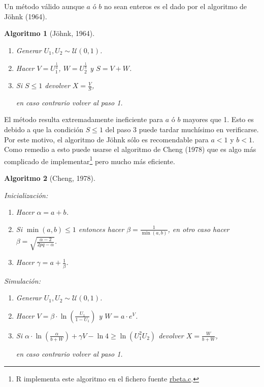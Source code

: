 \documentclass[
]{book}
\theoremstyle{break}
\newtheorem{conjecture}{Algoritmo}[chapter]
\theoremstyle{nonumberplain}
\begin{document}
Un método válido aunque \(a\) ó \(b\) no sean enteros es el dado por el
algoritmo de Jöhnk (1964).

\begin{conjecture}[Jöhnk, 1964]
\protect\hypertarget{cnj:johnk}{}\label{cnj:johnk}

\begin{enumerate}
\def\labelenumi{\arabic{enumi}.}
\item
  Generar \(U_1, U_2\sim \mathcal{U}(0, 1)\).
\item
  Hacer \(V = U_1^{\frac1a}\), \(W = U_2^{\frac1b}\) y \(S = V+W\).
\item
  Si \(S \leq 1\) devolver \(X = \frac VS\),

  en caso contrario volver al paso 1.
\end{enumerate}

\end{conjecture}

El método resulta extremadamente ineficiente para \(a\) ó \(b\) mayores que 1.
Esto es debido a que la condición \(S\leq1\) del paso 3 puede tardar muchísimo en verificarse.
Por este motivo, el algoritmo de Jöhnk sólo es recomendable para \(a<1\) y \(b<1\).
Como remedio a esto puede usarse el algoritmo de Cheng (1978) que es algo más complicado de implementar\footnote{R implementa este algoritmo en el fichero fuente \href{https://svn.r-project.org/R/trunk/src/nmath/rbeta.c}{rbeta.c}.} pero mucho más eficiente.

\begin{conjecture}[Cheng, 1978]
\protect\hypertarget{cnj:cheng}{}\label{cnj:cheng}

Inicialización:

\begin{enumerate}
\def\labelenumi{\arabic{enumi}.}
\item
  Hacer \(\alpha = a + b\).
\item
  Si \(\min(a,b) \leq1\) entonces hacer \(\beta=\frac1{\min( a,b)}\), en otro caso hacer \(\beta=\sqrt{\frac{\alpha-2}{2pq-\alpha}}\).
\item
  Hacer \(\gamma=a+\frac1\beta\).
\end{enumerate}

Simulación:

\begin{enumerate}
\def\labelenumi{\arabic{enumi}.}
\item
  Generar \(U_1, U_2\sim \mathcal{U}(0, 1)\).
\item
  Hacer \(V=\beta\cdot\ln\left( \frac{U_1}{1-U_1}\right)\) y \(W=a\cdot e^{V}\).
\item
  Si \(\alpha\cdot\ln\left( \frac\alpha{b+W}\right) +\gamma V-\ln4 \ge \ln\left( U_1^{2}U_2\right)\) devolver \(X=\frac W{b+W}\),

  en caso contrario volver al paso 1.
\end{enumerate}

\end{conjecture}
\end{document}
